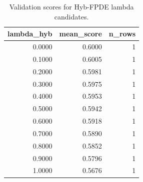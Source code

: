 \begin{table}[t]
\caption{Validation scores for Hyb-FPDE lambda candidates.}
\label{tab:lambda_distribution_computed}
\centering
\begin{tabular}{rrr}
\toprule
lambda\_hyb & mean\_score & n\_rows \\
\midrule
0.0000 & 0.6000 & 1 \\
0.1000 & 0.6005 & 1 \\
0.2000 & 0.5981 & 1 \\
0.3000 & 0.5975 & 1 \\
0.4000 & 0.5953 & 1 \\
0.5000 & 0.5942 & 1 \\
0.6000 & 0.5918 & 1 \\
0.7000 & 0.5890 & 1 \\
0.8000 & 0.5852 & 1 \\
0.9000 & 0.5796 & 1 \\
1.0000 & 0.5676 & 1 \\
\bottomrule
\end{tabular}

\end{table}
